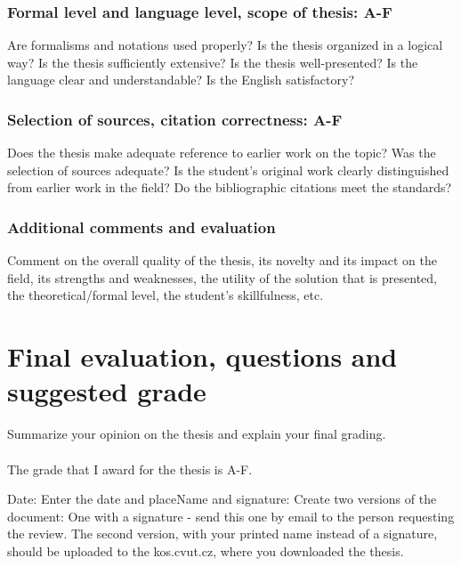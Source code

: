 \documentclass{article}
\begin{document}
\subsubsection*{Formal level and language level, scope of thesis: A-F} %
Are formalisms and notations used properly? Is the thesis organized in a logical way? Is the thesis sufficiently extensive? Is the thesis well-presented? Is the language clear and understandable? Is the English satisfactory?

\subsubsection*{Selection of sources, citation correctness: A-F} %
Does the thesis make adequate reference to earlier work on the topic? Was the selection of sources adequate? Is the student’s original work clearly distinguished from earlier work in the field? Do the bibliographic citations meet the standards?

\subsubsection*{Additional comments and evaluation} %
Comment on the overall quality of the thesis, its novelty and its impact on the field, its strengths and weaknesses, the utility of the solution that is presented, the theoretical/formal level, the student’s skillfulness, etc.

\section{Final evaluation, questions and suggested grade}
Summarize your opinion on the thesis and explain your final grading.\\
\\\vspace{5mm}
The grade that I award for the thesis is A-F. %
\vspace{5mm}

Date: Enter the date and place\hfill                       Name and signature:\hspace{2cm}
\vspace{5mm}
\vfill
Create two versions of the document: One with a signature - send this one by email to the person requesting the review. The second version, with your printed name instead of a signature, should be uploaded to the kos.cvut.cz, where you downloaded the thesis.
\end{document}
